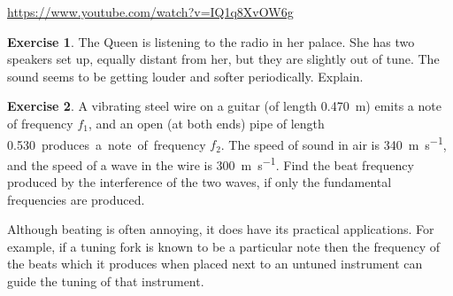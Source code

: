 \documentclass[a4paper]{amsbook}
\newcommand{\goandwatch}[1]{
\begin{center}
\begin{tcolorbox}[width=0.8\textwidth,colback={SkyBlue!20},title={\textbf{Go and watch...}},colbacktitle=MidnightBlue,coltitle=White]
  \textcolor{MidnightBlue}{\url{#1}}
\end{tcolorbox}
\end{center}}
\theoremstyle{definition}
\newtheorem{exercise}{Exercise}
\numberwithin{exercise}{chapter}
\numberwithin{exercise}{chapter}
\begin{document}
\goandwatch{https://www.youtube.com/watch?v=IQ1q8XvOW6g}

\begin{exercise}
  The Queen is listening to the radio in her palace. She has two speakers set up, equally distant from her, but they are
  slightly out of tune. The sound seems to be getting louder and softer periodically. Explain.
\end{exercise}

\begin{exercise}
  A vibrating steel wire on a guitar (of length \SI{0.470}{\metre}) emits a note of frequency $ f_1 $, and
  an open (at both ends) pipe of length \SI{0.530} produces a note of frequency $ f_2 $. The speed of sound in air
  is \SI{340}{\metre\per\second}, and the speed of a wave in the wire is \SI{300}{\metre\per\second}. Find the beat frequency
  produced by the interference of the two waves, if only the fundamental frequencies are produced.
\end{exercise}

Although beating is often annoying, it does have its practical applications. For example, if a tuning fork is known to be
a particular note then the frequency of the beats which it produces when placed next to an untuned instrument can guide
the tuning of that instrument.
\end{document}
